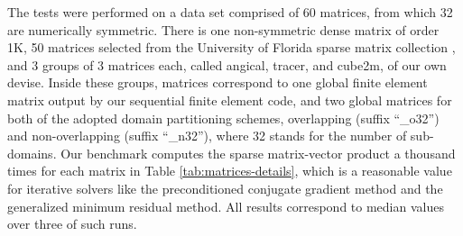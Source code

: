 \documentclass[11pt]{article}
\begin{document}
The tests were performed on a data set comprised of 60 matrices, from which 32 are
numerically symmetric.  There is one non-symmetric dense matrix of order 1K, 50
matrices selected from the University of Florida sparse matrix collection
\cite{Dav97a}, and 3 groups of 3 matrices each, called angical, tracer, and
cube2m, of our own devise.  Inside these groups, matrices correspond to
one global finite element matrix output by our sequential finite element code,
and two global matrices for both of the adopted domain partitioning schemes,
overlapping (suffix ``\_o32'') and non-overlapping (suffix ``\_n32''),
where 32 stands for the number of sub-domains.  Our benchmark computes the sparse
matrix-vector product a thousand times for each matrix in Table
\ref{tab:matrices-details}, which is a reasonable value for iterative solvers
like the preconditioned conjugate gradient method and the generalized
minimum residual method. All results correspond to
median values over three of such runs.
\end{document}
